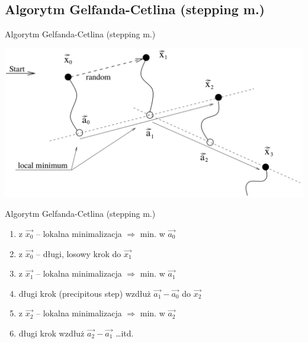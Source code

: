 \subsection{Algorytm Gelfanda-Cetlina (stepping m.)}
  \begin{frame}{Algorytm Gelfanda-Cetlina (stepping m.)}
    \begin{center}
      \includegraphics[width=1\textwidth]{img/17/algo_g-c}
    \end{center}
  \end{frame}

  \begin{frame}{Algorytm Gelfanda-Cetlina (stepping m.)}
    \begin{enumerate}
      \item z $\vec{x_{0}}$ -- lokalna minimalizacja $\Rightarrow$
      min. w $\vec{a_{0}}$
      \item z $\vec{x_{0}}$ -- długi, losowy krok do $\vec{x_{1}}$
      \item z $\vec{x_{1}}$ -- lokalna minimalizacja $\Rightarrow$
      min. w $\vec{a_{1}}$
      \item długi krok (precipitous step) wzdłuż
      $\vec{a_{1}} - \vec{a_{0}}$ do $\vec{x_{2}}$
      \item z $\vec{x_{2}}$ -- lokalna minimalizacja $\Rightarrow$
      min. w $\vec{a_{2}}$
      \item długi krok wzdłuż $\vec{a_{2}} - \vec{a_{1}}$ \dots itd.
    \end{enumerate}
  \end{frame}

